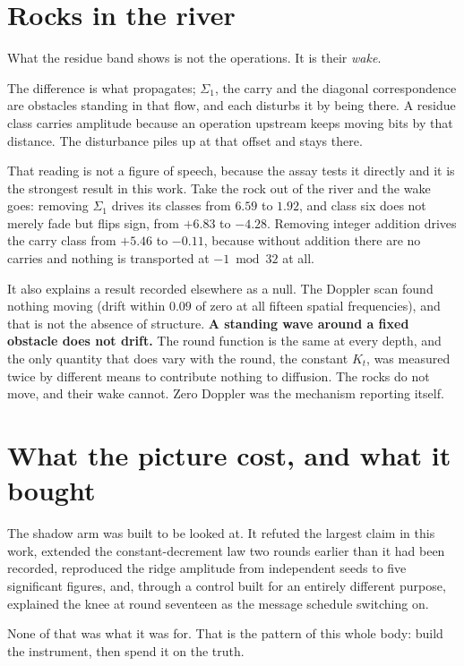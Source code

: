 \section{Rocks in the river}

What the residue band shows is not the operations. It is their \emph{wake}.

The difference is what propagates; \(\Sigma_1\), the carry and the diagonal correspondence are
obstacles standing in that flow, and each disturbs it by being there. A residue class carries
amplitude because an operation upstream keeps moving bits by that distance. The disturbance
piles up at that offset and stays there.

That reading is not a figure of speech, because the assay tests it directly and it is the strongest
result in this work. Take the rock out of the river and the wake goes: removing \(\Sigma_1\) drives
its classes from \(6.59\) to \(1.92\), and class six does not merely fade but flips sign, from
\(+6.83\) to \(-4.28\). Removing integer addition drives the carry class from \(+5.46\) to
\(-0.11\), because without addition there are no carries and nothing is transported at
\(-1 \bmod 32\) at all.

It also explains a result recorded elsewhere as a null. The Doppler scan found nothing moving
(drift within \(0.09\) of zero at all fifteen spatial frequencies), and that is not the absence of
structure. \textbf{A standing wave around a fixed obstacle does not drift.} The round function is
the same at every depth, and the only quantity that does vary with the round, the constant \(K_t\), was
measured twice by different means to contribute nothing to diffusion. The rocks do not move,
and their wake cannot. Zero Doppler was the mechanism reporting itself.

\section{What the picture cost, and what it bought}

The shadow arm was built to be looked at. It refuted the largest claim in this work, extended the
constant-decrement law two rounds earlier than it had been recorded, reproduced the ridge amplitude
from independent seeds to five significant figures, and, through a control built for an entirely
different purpose, explained the knee at round seventeen as the message schedule switching on.

None of that was what it was for. That is the pattern of this whole body: build the instrument,
then spend it on the truth.
